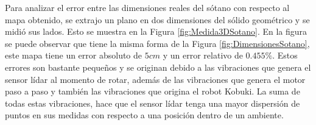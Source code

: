 Para analizar el error entre las dimensiones reales del sótano con respecto al mapa 
obtenido, se extrajo un plano en dos dimensiones del sólido geométrico y se midió sus 
lados. Esto se muestra en la Figura \ref{fig:Medida3DSotano}. En la figura se puede 
observar que tiene la misma forma de la Figura \ref{fig:DimensionesSotano}, este mapa 
tiene un error absoluto de $5 cm$ y un error relativo de $0.455 \%$. Estos errores son 
bastante pequeños y se originan debido a las vibraciones que genera el sensor lídar al 
momento de rotar, además de las vibraciones que genera el motor paso a paso y también 
las vibraciones que origina el robot Kobuki. La suma de todas estas vibraciones, hace 
que el sensor lídar tenga una mayor dispersión de puntos en sus medidas con respecto 
a una posición dentro de un ambiente. 



 
